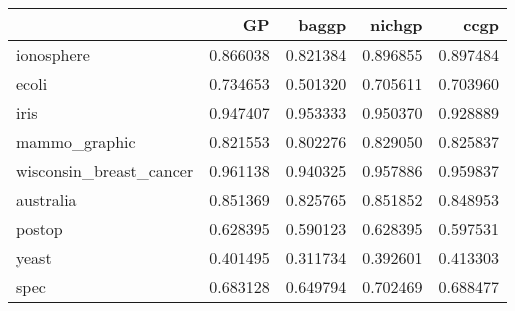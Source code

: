 \begin{tabular}{lrrrr}
\toprule
{} &        GP &     baggp &    nichgp &      ccgp \\
\midrule
ionosphere              &  0.866038 &  0.821384 &  0.896855 &  0.897484 \\
ecoli                   &  0.734653 &  0.501320 &  0.705611 &  0.703960 \\
iris                    &  0.947407 &  0.953333 &  0.950370 &  0.928889 \\
mammo\_graphic           &  0.821553 &  0.802276 &  0.829050 &  0.825837 \\
wisconsin\_breast\_cancer &  0.961138 &  0.940325 &  0.957886 &  0.959837 \\
australia               &  0.851369 &  0.825765 &  0.851852 &  0.848953 \\
postop                  &  0.628395 &  0.590123 &  0.628395 &  0.597531 \\
yeast                   &  0.401495 &  0.311734 &  0.392601 &  0.413303 \\
spec                    &  0.683128 &  0.649794 &  0.702469 &  0.688477 \\
\bottomrule
\end{tabular}
